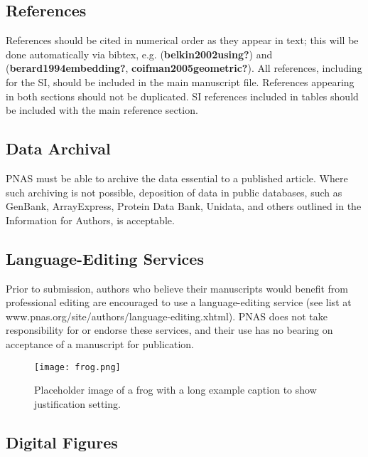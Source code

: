 \documentclass[9pt,twocolumn,twoside,]{pnas-new}
\begin{document}
\hypertarget{references}{%
\subsection*{References}\label{references}}

References should be cited in numerical order as they appear in text;
this will be done automatically via bibtex, e.g.
(\textbf{belkin2002using?}) and (\textbf{berard1994embedding?},
\textbf{coifman2005geometric?}). All references, including for the SI,
should be included in the main manuscript file. References appearing in
both sections should not be duplicated. SI references included in tables
should be included with the main reference section.

\hypertarget{data-archival}{%
\subsection*{Data Archival}\label{data-archival}}

PNAS must be able to archive the data essential to a published article.
Where such archiving is not possible, deposition of data in public
databases, such as GenBank, ArrayExpress, Protein Data Bank, Unidata,
and others outlined in the Information for Authors, is acceptable.

\hypertarget{language-editing-services}{%
\subsection*{Language-Editing
Services}\label{language-editing-services}}

Prior to submission, authors who believe their manuscripts would benefit
from professional editing are encouraged to use a language-editing
service (see list at www.pnas.org/site/authors/language-editing.xhtml).
PNAS does not take responsibility for or endorse these services, and
their use has no bearing on acceptance of a manuscript for publication.

\begin{figure}
\centering
\texttt{[image: frog.png]}
\caption{Placeholder image of a frog with a long example caption to show
justification setting.{}}
\end{figure}

\hypertarget{sec:figures}{%
\subsection*{Digital Figures}\label{sec:figures}}
\end{document}
